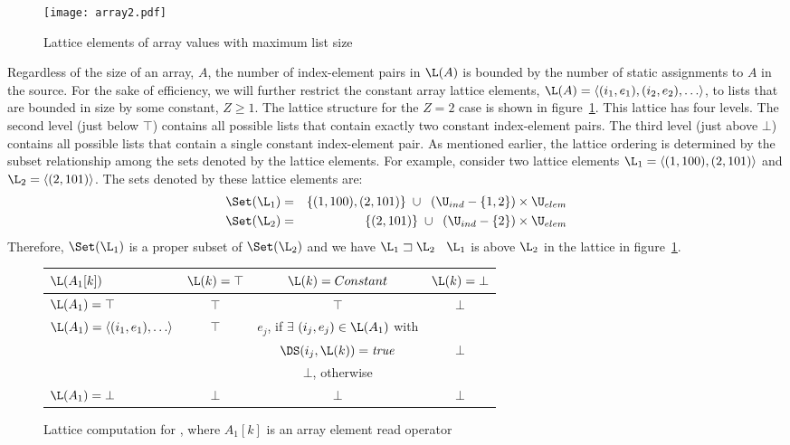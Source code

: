 \begin{figure}%
\centerline{\texttt{[image: array2.pdf]}}
\caption{Lattice elements of array values with maximum list size }
\label{fig:array2}
\end{figure}

Regardless of the size of an array, $A$, the number
of index-element pairs in  $\L(A)$ is bounded by the number of
static assignments to $A$ in the source. 
For the sake of efficiency, we will further restrict the constant array lattice
elements, $\L(A) = \langle(i_1,e_1), (i_2,e_2), \ldots\rangle$,
to lists that are bounded in size by some constant, $Z\geq 1$.
The lattice structure for the $Z=2$ case is shown in figure~\ref{fig:array2}.  This lattice has four levels.  The second level (just below $\top$)
contains all possible 
lists that contain exactly two constant index-element pairs.  The third level (just above $\bot$) contains all possible 
lists that contain a single constant index-element pair.  
As mentioned earlier,
the lattice ordering is determined by the subset relationship among the sets denoted by the lattice elements.  For example, consider two lattice elements $\L_1 = \langle(1,100), (2,101)\rangle$ and $\L_2 = \langle(2,101)\rangle$.  The sets denoted by these lattice elements are:
\begin{eqnarray*}
\Set(\L_1) & = & \{(1,100), (2, 101)\} \;\cup\;\;
(\U_{ind} - \{1,2\}) \times \U_{elem} \\
\Set(\L_2) & = & \{(2, 101)\} \;\cup\;\;
(\U_{ind} - \{2\}) \times \U_{elem}
\end{eqnarray*}
Therefore, $\Set(\L_1)$ is a proper subset of $\Set(\L_2)$ and we have $\L_1 \sqsupset \L_2$ \ie\ $\L_1$ is above $\L_2$ in the lattice in figure~\ref{fig:array2}.


\begin{figure}%
\begin{center}
\begin{tabular}{|l||c|c|c|}
\hline
$\L(A_1[k])$ & $\L(k) = \top$ & $\L(k) = Constant$ & $\L(k) = \bot$ \\
\hline \hline
$\L(A_1) = \top$ & $\top$ & $\top$ & $\bot$ \\
\hline
$\L(A_1) = \langle (i_1,e_1), \ldots \rangle$ & $\top$ & $e_j$, 
if $\exists$
$(i_j,e_j) \in \L(A_1)$ with &\\
& & $\DS(i_j, \L(k)) = \mbox{\it true}$ & $\bot$\\
& & $\bot$, otherwise & \\
\hline
$\L(A_1) = \bot$ & $\bot$ & $\bot$ & $\bot$ \\
\hline
\end{tabular}
\end{center}
\caption{Lattice computation for ,
where $A_1[k]$ is an 
array element read operator}
\label{fig:aref}
\end{figure}

